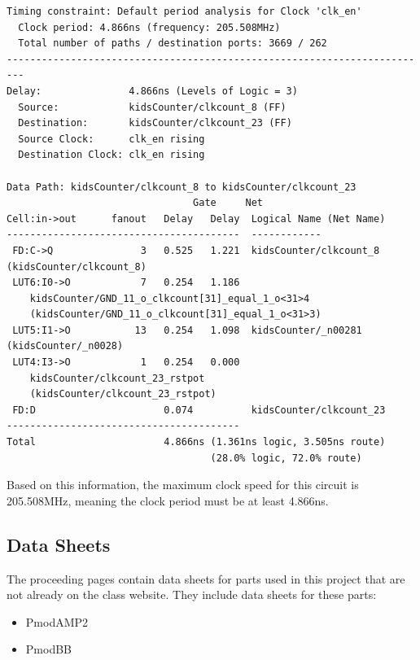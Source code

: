 \documentclass{article}
\begin{document}
    \begin{lstlisting}
Timing constraint: Default period analysis for Clock 'clk_en'
  Clock period: 4.866ns (frequency: 205.508MHz)
  Total number of paths / destination ports: 3669 / 262
-------------------------------------------------------------------------
Delay:               4.866ns (Levels of Logic = 3)
  Source:            kidsCounter/clkcount_8 (FF)
  Destination:       kidsCounter/clkcount_23 (FF)
  Source Clock:      clk_en rising
  Destination Clock: clk_en rising

Data Path: kidsCounter/clkcount_8 to kidsCounter/clkcount_23
                                Gate     Net
Cell:in->out      fanout   Delay   Delay  Logical Name (Net Name)
----------------------------------------  ------------
 FD:C->Q               3   0.525   1.221  kidsCounter/clkcount_8 (kidsCounter/clkcount_8)
 LUT6:I0->O            7   0.254   1.186  
    kidsCounter/GND_11_o_clkcount[31]_equal_1_o<31>4 
    (kidsCounter/GND_11_o_clkcount[31]_equal_1_o<31>3)
 LUT5:I1->O           13   0.254   1.098  kidsCounter/_n00281 (kidsCounter/_n0028)
 LUT4:I3->O            1   0.254   0.000  
    kidsCounter/clkcount_23_rstpot 
    (kidsCounter/clkcount_23_rstpot)
 FD:D                      0.074          kidsCounter/clkcount_23
----------------------------------------
Total                      4.866ns (1.361ns logic, 3.505ns route)
                                   (28.0% logic, 72.0% route)
    \end{lstlisting}

    Based on this information, the maximum clock speed for this circuit is 205.508MHz, meaning the clock period must be at least 4.866ns.

	\subsection{Data Sheets}

  	The proceeding pages contain data sheets for parts used in this project that are not already on the class website. They include data sheets for these parts:

	\begin{itemize}
		\item PmodAMP2
		\item PmodBB
    \end{itemize}  	
\end{document}
